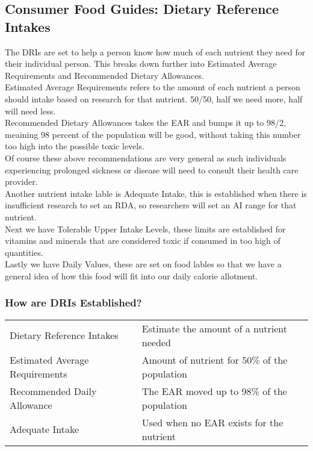 \documentclass[letterpaper, 11pt]{article}
\begin{document}
\subsection{Consumer Food Guides: Dietary Reference Intakes}
\label{sec:org8a369fd}
The DRIs are set to help a person know how much of each nutrient they need for their individual person. This breaks down further into Estimated Average Requirements and Recommended Dietary Allowances.\\
Estimated Average Requirements refers to the amount of each nutrient a person should intake based on research for that nutrient. 50/50, half we need more, half will need less.\\
Recommended Dietary Allowances takes the EAR and bumps it up to 98/2, meaining 98 percent of the population will be good, without taking this number too high into the possible toxic levels.\\
Of course these above recommendations are very general as such individuals experiencing prolonged sickness or disease will need to consult their health care provider.\\
Another nutrient intake lable is Adequate Intake,  this is established when there is insufficient research to set an RDA, so researchers will set an AI range for that nutrient.\\
Next we have Tolerable Upper Intake Levels,  these limits are established for vitamins and minerals that are considered toxic if consumed in too high of quantities.\\
Lastly we have Daily Values, these are set on food lables so that we have a general idea of how this food will fit into our daily calorie allotment.\\
\subsubsection{How are DRIs Established?}
\label{sec:orgdff8dab}
\begin{center}
\begin{tabular}{ll}
Dietary Reference Intakes & Estimate the amount of a nutrient needed\\
Estimated Average Requirements & Amount of nutrient for 50\% of the population\\
Recommended Daily Allowance & The EAR moved up to 98\% of the population\\
Adequate Intake & Used when no EAR exists for the nutrient\\
\end{tabular}
\end{center}
\end{document}
